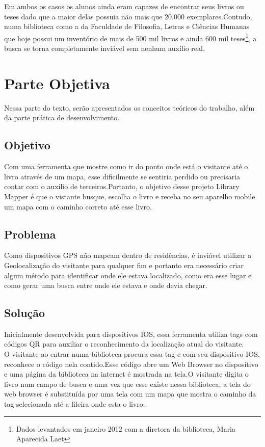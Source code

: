 \documentclass[a4paper,10pt]{article}
\begin{document}
    Em ambos os casos os alunos ainda eram capazes de encontrar seus livros ou teses dado que a maior delas possuia
    não mais que 20.000 exemplares.Contudo, numa biblioteca como a da Faculdade de Filosofia, Letras e Ciências Humanas
    que hoje possui um inventório de mais de 500 mil livros e ainda 600 mil teses\footnote[1]{Dados levantados em janeiro 2012 com a diretora da biblioteca, Maria Aparecida Laet}, a busca se torna completamente inviável
    sem nenhum auxílio real.\\
   
    
    \section{Parte Objetiva}
    Nessa parte do texto, serão apresentados os conceitos teóricos do trabalho, além da parte prática
    de desenvolvimento.

    \subsection{Objetivo}
    Com uma ferramenta que mostre como ir do ponto onde está o visitante até o livro através de um mapa, esse dificilmente se sentiria perdido 
    ou precisaria contar com o auxílio de terceiros.Portanto, o objetivo desse projeto Library Mapper é que o vistante
    busque, escolha o livro e receba no seu aparelho mobile um mapa com o caminho correto até esse livro.
    
    \subsection{Problema}

    Como dispositivos GPS não mapeam dentro de residências, é inviável utilizar a Geolocalização do visitante para qualquer fim e portanto
    era necessário criar algum método para identificar onde ele estava localizado, como era esse lugar e como gerar uma busca
    entre onde ele estava e onde devia chegar.
    
    
    \subsection{Solução}
    
  Inicialmente desenvolvida para dispositivos IOS, essa ferramenta utiliza tags com códigos QR para auxiliar 
  o reconhecimento da localização atual do visitante.\\

  O visitante ao entrar numa biblioteca procura essa tag e com seu dispositivo IOS, reconhece o código 
  nela contido.Esse código abre um Web Browser no dispositivo e uma página da biblioteca na internet é 
  mostrada na tela.O visitante digita o livro num campo de busca e uma vez que esse existe nessa biblioteca, 
  a tela do web browser é substituída por uma tela com um mapa que mostra o caminho da tag selecionada 
  até a fileira onde esta o livro.\\
  
\end{document}
